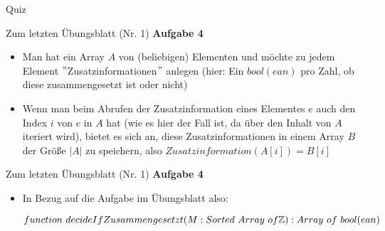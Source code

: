 







\begin{frame}[t]{Quiz}
	\thasse{\Socrative}
\end{frame}

\iffalse

\begin{frame}{Zum letzten Übungsblatt (Nr. 1)}
	\textbf{Aufgabe 4} \\[0,125cm]
	\begin{itemize}
		\item Man hat ein Array $A$ von (beliebigen) Elementen und möchte zu jedem Element $"$Zusatzinformationen$"$ anlegen (hier: Ein $bool(ean)$ pro Zahl, ob diese zusammengesetzt ist oder nicht)
		\item Wenn man beim Abrufen der Zusatzinformation eines Elementes $e$ auch den Index $i$ von $e$ in $A$ hat (wie es hier der Fall ist, da über den Inhalt von $A$ iteriert wird), bietet es sich an, diese Zusatzinformationen in einem Array $B$ der Größe $|A|$ zu speichern, also $Zusatzinformation(A[i]) = B[i]$
	\end{itemize}
\end{frame}

\begin{frame}{Zum letzten Übungsblatt (Nr. 1)}
	\textbf{Aufgabe 4} \\[0,125cm]
	\begin{itemize}
		\item In Bezug auf die Aufgabe im Übungsblatt also: \\
		\footnotesize
		\begin{exampleblock}{ }
			\begin{algorithm}[H]
				\DontPrintSemicolon
				$function\ decideIfZusammengesetzt(M : Sorted\ Array\ of \mathbb{Z}) : Array\ of\ bool(ean)$\;
			\end{algorithm}
		\end{exampleblock}
	\end{itemize}
\end{frame}



